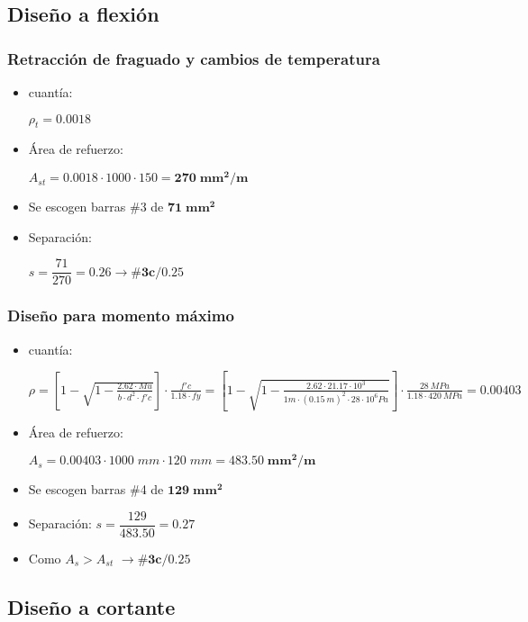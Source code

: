 \documentclass[12pt]{article}
\begin{document}
\subsection*{Diseño a flexión}
\subsubsection*{Retracción de fraguado y cambios de temperatura}
\begin{itemize}
    \item cuantía:
    
    $\rho_{t}=0.0018$
    
    \item Área de refuerzo:
    
    $A_{st}=0.0018\cdot1000\cdot150=\mathbf{270\;mm^2/m}$
    
    \item Se escogen barras \#3 de $\mathbf{71\;mm^2}$
    
    \item Separación:
    
    $s=\dfrac{71}{270}=0.26 \rightarrow {\mathbf{\#3c/0.25}}$
 \end{itemize}   
    \subsubsection*{Diseño para momento máximo}
\begin{itemize}
 
 \item cuantía:
    
    $\rho=\left[1-\sqrt{1-\frac{2.62\cdot Mu}{b\cdot d^{2}\cdot f'c}} \right]\cdot \frac{f'c}{1.18\cdot fy}=\left[1-\sqrt{1-\frac{2.62\cdot 21.17\cdot10^{3}}{1m\cdot (0.15~m)^{2}\cdot 28\cdot 10^{6}Pa}} \right]\cdot \frac{28~MPa}{1.18\cdot 420~MPa}=\mathbf{0.00403}$

 \item Área de refuerzo:
 
 $A_{s}=0.00403\cdot1000\;mm\cdot120\;mm=\mathbf{483.50\;mm^2/m}$
\item Se escogen barras \#4 de $\mathbf{129\;mm^2}$
\item Separación:
$s=\dfrac{129}{483.50}=0.27$
\item Como $A_{s}>A_{st}$ $  \rightarrow {\mathbf{\#3c/0.25}}$
\end{itemize}

\subsection*{Diseño a cortante}
\end{document}
